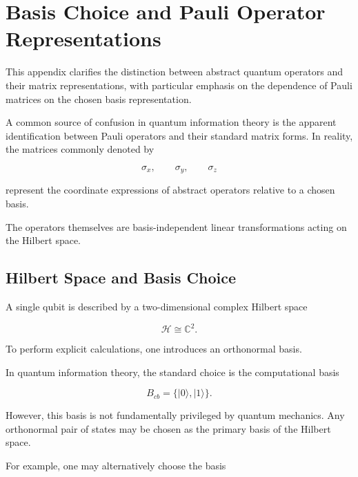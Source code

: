 
\section{Basis Choice and Pauli Operator Representations}

This appendix clarifies the distinction between abstract quantum operators and their matrix representations, with particular emphasis on the dependence of Pauli matrices on the chosen basis representation.

\medskip

A common source of confusion in quantum information theory is the apparent identification between Pauli operators and their standard matrix forms. In reality, the matrices commonly denoted by

\[
\sigma_x,
\qquad
\sigma_y,
\qquad
\sigma_z
\]

represent the coordinate expressions of abstract operators relative to a chosen basis.

The operators themselves are basis-independent linear transformations acting on the Hilbert space.


\subsection*{Hilbert Space and Basis Choice}

A single qubit is described by a two-dimensional complex Hilbert space

\[
\mathcal H \cong \mathbb C^2.
\]

To perform explicit calculations, one introduces an orthonormal basis.

In quantum information theory, the standard choice is the computational basis

\[
B_{cb}
=
\{
|0\rangle,
|1\rangle
\}.
\]

However, this basis is not fundamentally privileged by quantum mechanics. Any orthonormal pair of states may be chosen as the primary basis of the Hilbert space.

\medskip

For example, one may alternatively choose the basis

